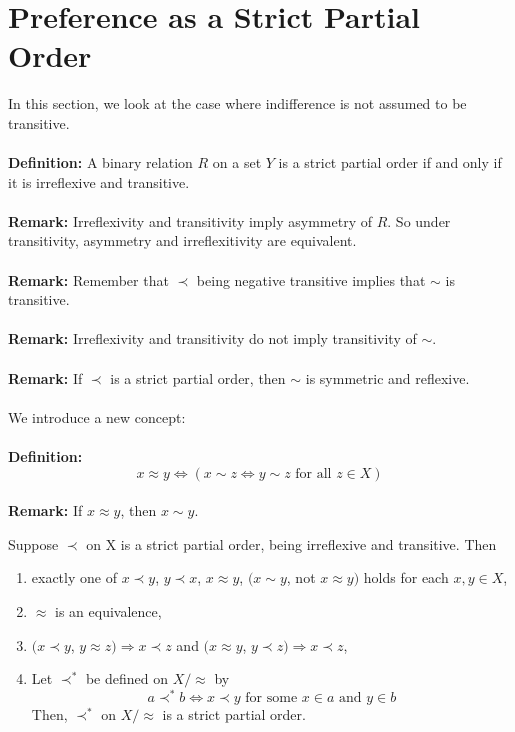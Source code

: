 \documentclass[10pt,a4paper,oneside]{article}
\begin{document}
\section{Preference as a Strict Partial Order}
In this section, we look at the case where indifference is not assumed to be transitive.\\ \\
{\bf Definition:} A binary relation $R$ on a set $Y$ is a strict partial order if and only if it is irreflexive and transitive.\\ \\
{\bf Remark:} Irreflexivity and transitivity imply asymmetry of $R$. So under transitivity, asymmetry and irreflexitivity are equivalent.\\ \\
{\bf Remark:} Remember that $\prec$ being negative transitive implies that $\sim$ is transitive.\\ \\
{\bf Remark:} Irreflexivity and transitivity do not imply transitivity of $\sim$.\\ \\
{\bf Remark:} If $\prec$ is a strict partial order, then $\sim$ is symmetric and reflexive.\\ \\
We introduce a new concept:\\ \\
{\bf Definition:} $$x \approx y \Leftrightarrow (x \sim z \Leftrightarrow y \sim z \text{ for all } z \in X)$$\\
{\bf Remark:} If $x \approx y$, then $x \sim y$.\\
\begin{Thm} Suppose $\prec$ on X is a strict partial order, being irreflexive and transitive. Then
	\begin{enumerate}[label=\arabic*.]
		\item exactly one of $x\prec y$, $y\prec x$, $x \approx y$, $(x \sim y$, not $x \approx y)$ holds for each $x, y \in X$,
		\item $\approx$ is an equivalence,
		\item $(x \prec y$, $ y \approx z) \Rightarrow x \prec z$ and $(x \approx y$, $y  \prec z ) \Rightarrow x \prec z$,
		\item Let $\prec^*$ be defined on $X/\approx$ by $$a \prec^* b \Leftrightarrow x \prec y \text{ for some } x \in a \text { and } y \in b$$ Then, $\prec^*$ on $X/\approx$ is a strict partial order.
	\end{enumerate}
\end{Thm}
\end{document}

